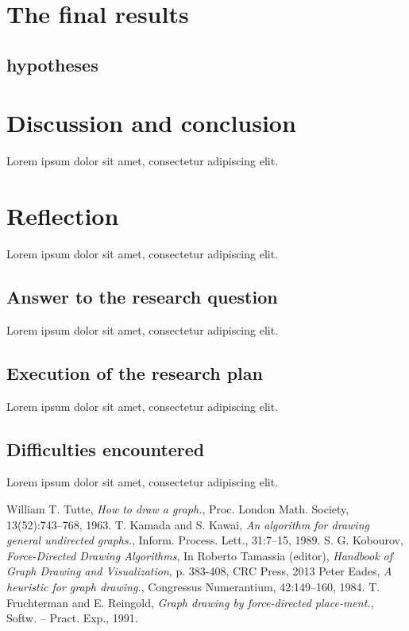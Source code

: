 \documentclass[a4paper,12pt,twoside]{article}
\begin{document}
\section{The final results}\label{s:results}

\subsection{hypotheses}

\section{Discussion and conclusion}
Lorem ipsum dolor sit amet, consectetur adipiscing elit.

\section{Reflection}
Lorem ipsum dolor sit amet, consectetur adipiscing elit.
\subsection{Answer to the research question}
Lorem ipsum dolor sit amet, consectetur adipiscing elit.
\subsection{Execution of the research plan}
Lorem ipsum dolor sit amet, consectetur adipiscing elit.\subsection{Difficulties encountered}
Lorem ipsum dolor sit amet, consectetur adipiscing elit.

\begin{thebibliography}{99}
William T. Tutte, \emph{How to draw a graph.}, Proc. London Math. Society, 13(52):743–768, 1963.
T. Kamada and S. Kawai, \emph{An algorithm for drawing general undirected graphs.}, Inform. Process. Lett., 31:7–15, 1989.
S. G. Kobourov, \emph{Force-Directed Drawing Algorithms}, In Roberto Tamassia (editor), \emph{Handbook of Graph Drawing and Visualization}, p. 383-408, CRC Press, 2013
 Peter Eades, \emph{A heuristic for graph drawing.}, Congressus Numerantium, 42:149–160, 1984.
T. Fruchterman and E. Reingold, \emph{Graph drawing by force-directed place-ment.}, Softw. – Pract. Exp., 1991.
\end{thebibliography}
\end{document}
